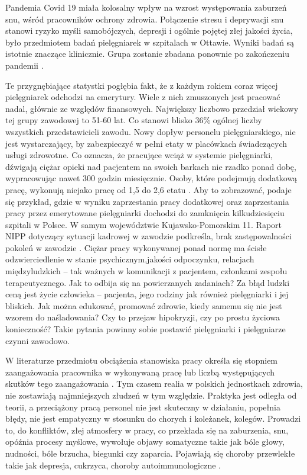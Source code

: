 \documentclass[a4paper,12pt,twoside,openany]{report}
\begin{document}
Pandemia Covid 19 miała kolosalny wpływ na wzrost występowania zaburzeń snu, wśród pracowników ochrony zdrowia. Połączenie stresu i deprywacji snu stanowi ryzyko myśli samobójczych, depresji i ogólnie pojętej złej jakości życia, było przedmiotem badań pielęgniarek w szpitalach w Ottawie. Wyniki badań są istotnie znaczące klinicznie. Grupa zostanie  zbadana ponownie  po zakończeniu pandemii \cite{sen}.

Te przygnębiające statystki pogłębia fakt, że z każdym rokiem coraz więcej pielęgniarek odchodzi na emerytury. Wiele z nich zmuszonych jest pracować nadal, głównie ze względów finansowych.  Największy liczbowo przedział wiekowy tej grupy zawodowej to 51-60 lat. Co stanowi blisko 36\% ogólnej liczby wszystkich przedstawicieli zawodu. Nowy dopływ personelu pielęgniarskiego, nie jest wystarczający, by zabezpieczyć w pełni etaty w placówkach świadczących usługi zdrowotne. Co oznacza, że pracujące wciąż w systemie pielęgniarki, dźwigają ciężar opieki nad pacjentem na swoich barkach nie rzadko ponad dobę, wypracowując nawet 300 godzin miesięcznie. Osoby, które podejmują dodatkową pracę, wykonują niejako pracę od 1,5 do 2,6 etatu \cite{cyfrowe}. Aby to zobrazować, podaje się przykład, gdzie w wyniku zaprzestania pracy dodatkowej oraz zaprzestania pracy przez emerytowane pielęgniarki dochodzi do zamknięcia kilkudziesięciu szpitali w Polsce. W samym województwie Kujawsko-Pomorskim 11. Raport NIPP dotyczący sytuacji kadrowej w zawodzie podkreśla, brak zastępowalności pokoleń w zawodzie \cite{statystyka}. Ciężar pracy wykonywanej ponad normę ma ścisłe odzwierciedlenie w  stanie psychicznym,jakości  odpoczynku, relacjach międzyludzkich – tak ważnych w komunikacji z pacjentem, członkami zespołu terapeutycznego. Jak to odbija się na powierzanych zadaniach? Za błąd ludzki ceną jest życie człowieka – pacjenta, jego rodziny jak również pielęgniarki i jej bliskich. Jak można edukować, promować zdrowie, kiedy samemu się nie jest wzorem do naśladowania? Czy to przejaw hipokryzji, czy po prostu życiowa konieczność? Takie pytania powinny sobie postawić pielęgniarki i pielęgniarze czynni zawodowo.

W literaturze przedmiotu obciążenia stanowiska pracy określa się stopniem zaangażowania pracownika w wykonywaną pracę lub liczbą występujących skutków tego zaangażowania \cite{stanowisko}. Tym czasem realia w polskich jednostkach zdrowia, nie zostawiają najmniejszych złudzeń w tym względzie. Praktyka jest odległa od teorii, a przeciążony pracą personel nie jest skuteczny w działaniu, popełnia błędy, nie jest empatyczny w stosunku do chorych i koleżanek, kolegów. Prowadzi to, do konfliktów, złej atmosfery w pracy, co przekłada się na zaburzenia, snu, opóźnia procesy myślowe, wywołuje objawy somatyczne takie jak bóle głowy, nudności, bóle brzucha, biegunki czy zaparcia. Pojawiają się choroby przewlekłe takie jak depresja, cukrzyca, choroby autoimmunologiczne \cite{zdrowie}.
\end{document}
